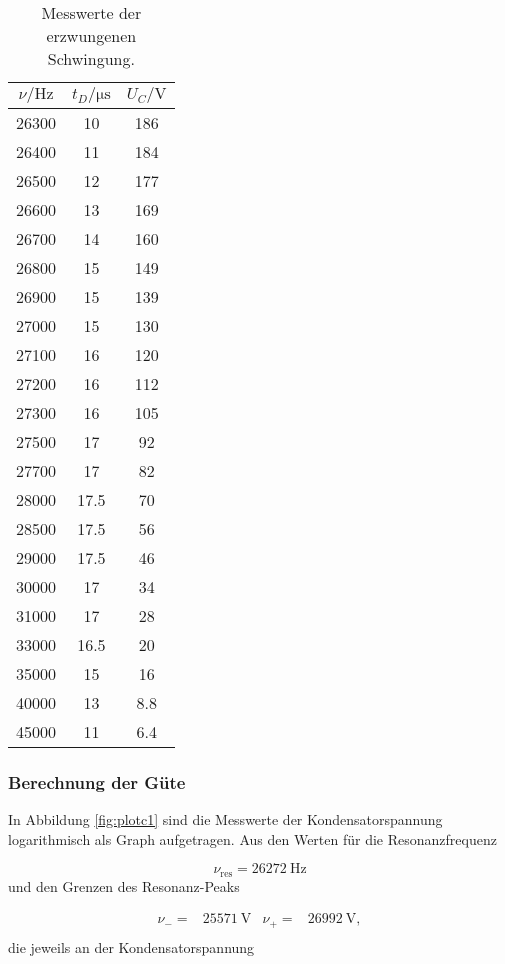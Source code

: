 \begin{table}[h]
  \centering
  \begin{tabular}{c c c}
    \toprule
    $\nu/\si{\hertz}$ & $t_D/\si{\micro\second}$ & $U_C/\si{\volt}$ \\
    \midrule
    26300 & 10 & 186 \\
    26400 & 11 & 184 \\
    26500 & 12 & 177 \\
    26600 & 13 & 169 \\
    26700 & 14 & 160 \\
    26800 & 15 & 149 \\
    26900 & 15 & 139 \\
    27000 & 15 & 130 \\
    27100 & 16 & 120 \\
    27200 & 16 & 112 \\
    27300 & 16 & 105 \\
    27500 & 17 & 92 \\
    27700 & 17 & 82 \\
    28000 & 17.5 & 70 \\
    28500 & 17.5 & 56 \\
    29000 & 17.5 & 46 \\
    30000 & 17 & 34 \\
    31000 & 17 & 28 \\
    33000 & 16.5 & 20 \\
    35000 & 15 & 16 \\
    40000 & 13 & 8.8 \\
    45000 & 11 & 6.4 \\
    \bottomrule
  \end{tabular}
  \caption{Messwerte der erzwungenen Schwingung.}
  \label{tab:Messung3b}
\end{table}


\subsubsection{Berechnung der Güte}

In Abbildung \ref{fig:plotc1} sind
die Messwerte der Kondensatorspannung logarithmisch als Graph aufgetragen.
Aus den Werten für die Resonanzfrequenz

\begin{equation}
  \nu_\text{res} = \SI{26272}{\hertz}
\end{equation}
und den Grenzen des Resonanz-Peaks

\begin{align}
  \nu_- = & \SI{25571}{\V} & \nu_+ = & \SI{26992}{\V}, \\
\end{align}
die jeweils an der Kondensatorspannung


